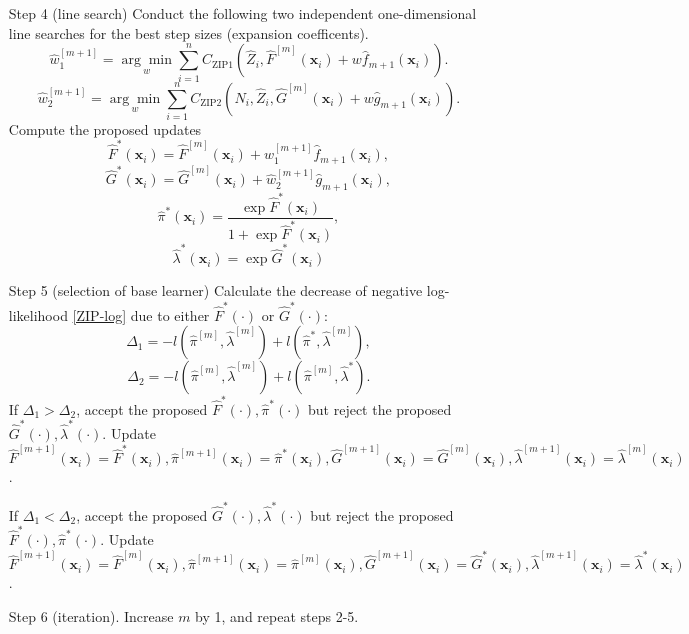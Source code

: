 \documentclass[11pt]{article}
\numberwithin{equation}{section}
\def\bx{\boldsymbol{x}}
\begin{document}
\begin{itemize}
\begin{itemize}
	\end{itemize}
	\item[Step 4] (line search) Conduct the following two independent one-dimensional line searches for the best step sizes (expansion coefficents).
		$$\hat{w}_1^{[m+1]}=\underset{w}{\arg\min}\sum_{i=1}^n C_\text{ZIP1}(\hat{Z}_i,\hat{F}^{[m]}(\bx_i)+w\hat{f}_{m+1}(\bx_i)).$$
		$$\hat{w}_2^{[m+1]}=\underset{w}{\arg\min}\sum_{i=1}^n C_\text{ZIP2}(N_i,\hat{Z}_i,\hat{G}^{[m]}(\bx_i)+w\hat{g}_{m+1}(\bx_i)).$$
		Compute the proposed updates
		$$\hat{F}^{*}(\bx_i)=\hat{F}^{[m]}(\bx_i)+\hat{w}^{[m+1]}_1\hat{f}_{m+1}(\bx_i),$$
		$$\hat{G}^{*}(\bx_i)=\hat{G}^{[m]}(\bx_i)+\hat{w}^{[m+1]}_2\hat{g}_{m+1}(\bx_i),$$
		$$\hat{\pi}^*(\bx_i)=\frac{\exp \hat{F}^{*}(\bx_i) }{1+\exp \hat{F}^{*}(\bx_i) },$$
		$$\hat{\lambda}^*(\bx_i)=\exp \hat{G}^*(\bx_i)$$ 
	\item[Step 5] (selection of base learner) 
	Calculate the decrease of negative log-likelihood \eqref{ZIP-log} due to either $\hat{F}^{*}(\cdot)$ or $\hat{G}^{*}(\cdot)$:
	$$\Delta_1=-l(\hat{\pi}^{[m]},\hat{\lambda}^{[m]})+l(\hat{\pi}^*,\hat{\lambda}^{[m]}),$$
	$$\Delta_2=-l(\hat{\pi}^{[m]},\hat{\lambda}^{[m]})+l(\hat{\pi}^{[m]},\hat{\lambda}^{*}).$$
	If $\Delta_1>\Delta_2$, accept the proposed $\hat{F}^{*}(\cdot), \hat{\pi}^*(\cdot)$ but reject the proposed $\hat{G}^{*}(\cdot), \hat{\lambda}^*(\cdot)$.
	Update $\hat{F}^{[m+1]}(\bx_i)=\hat{F}^{*}(\bx_i), \hat{\pi}^{[m+1]}(\bx_i)=\hat{\pi}^*(\bx_i), \hat{G}^{[m+1]}(\bx_i)=\hat{G}^{[m]}(\bx_i), \hat{\lambda}^{[m+1]}(\bx_i)=\hat{\lambda}^{[m]}(\bx_i)$.
	
	If $\Delta_1<\Delta_2$, accept the proposed $\hat{G}^{*}(\cdot), \hat{\lambda}^*(\cdot)$ but reject the proposed $\hat{F}^{*}(\cdot), \hat{\pi}^*(\cdot)$.
	Update $\hat{F}^{[m+1]}(\bx_i)=\hat{F}^{[m]}(\bx_i), \hat{\pi}^{[m+1]}(\bx_i)=\hat{\pi}^{[m]}(\bx_i), \hat{G}^{[m+1]}(\bx_i)=\hat{G}^{*}(\bx_i), \hat{\lambda}^{[m+1]}(\bx_i)=\hat{\lambda}^{*}(\bx_i)$.
	

	\item[Step 6] (iteration). Increase $m$ by 1, and repeat steps 2-5.
\end{itemize}
\end{document}
